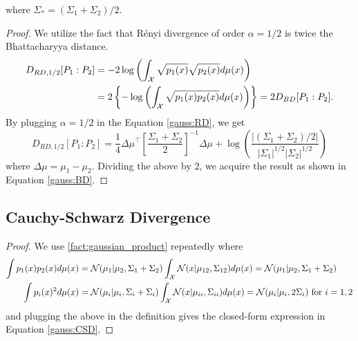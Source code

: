 \documentclass[11pt]{article}
\newcommand{\calN}{\mathcal{N}}
\newcommand{\Renyi}{R\'{e}nyi }
\begin{document}
\begin{center}
\end{center}
where $\Sigma_* = (\Sigma_1 + \Sigma_2)/2$.

\begin{proof}
	We utilize the fact that \Renyi divergence of order $\alpha=1/2$ is twice the Bhattacharyya distance.
	\begin{align*}
	D_{RD,1/2}[P_1:P_2] &= -2 \log\left( \int_{\cal{X}} \sqrt{p_1(x)}\sqrt{p_2(x)} d\mu(x) \right) \\&= 2 \left\lbrace -\log\left( \int_{\cal{X}} \sqrt{p_1(x)p_2(x)} d\mu(x)\right) \right\rbrace= 2 D_{BD}[P_1:P_2].
	\end{align*}
	By plugging $\alpha=1/2$  in the Equation \eqref{gauss:RD}, we get
	\begin{equation*}
	D_{RD,1/2}[P_1:P_2] = \frac{1}{4} \Delta \mu^\top \left\lbrack
	\frac{\Sigma_1+\Sigma_2}{2}
	\right\rbrack^{-1} \Delta \mu + \log \left(
	\frac{
		|(\Sigma_1+\Sigma_2)/2|
	}{
	|\Sigma_1|^{1/2} |\Sigma_2|^{1/2}
	}
	\right)
	\end{equation*}
	where $\Delta \mu = \mu_1 - \mu_2$. Dividing the above by 2, we acquire the result as shown in Equation \eqref{gauss:BD}.
\end{proof}


\subsection*{Cauchy-Schwarz Divergence}

\begin{center}
	\mybox[colback=orange!10]{\begin{equation}\label{gauss:CSD}
	D_{CSD} [P_1 : P_2] = -\log\left(
\frac{\calN(\mu_1\vert \mu_2, \Sigma_1+\Sigma_2)}{\sqrt{\calN(\mu_1\vert \mu_1, 2\Sigma_1)\cdot \calN(\mu_2\vert \mu_2, 2\Sigma_2)}}
\right)
		\end{equation}}		
\end{center}

\begin{proof}
We use \ref{fact:gaussian_product} repeatedly where 
\begin{align*}
\int p_1 (x) p_2 (x) d\mu(x) &= \calN(\mu_1 \vert \mu_2, \Sigma_1 + \Sigma_2) \int_{\cal{X}} \calN(x|\mu_{12},\Sigma_{12}) d\mu(x)= \calN(\mu_1\vert\mu_2, \Sigma_1+\Sigma_2)\\
\int p_i (x)^2 d\mu(x) &= \calN(\mu_i\vert \mu_i, \Sigma_i + \Sigma_i) \int_{\cal{X}} \calN(x\vert \mu_{ii},\Sigma_{ii}) d\mu(x) = \calN(\mu_i \vert \mu_i, 2\Sigma_i)\textrm{ for }i=1,2
\end{align*}
and plugging the above in the definition gives the closed-form expression in Equation \eqref{gauss:CSD}. 
\end{proof}
\end{document}

